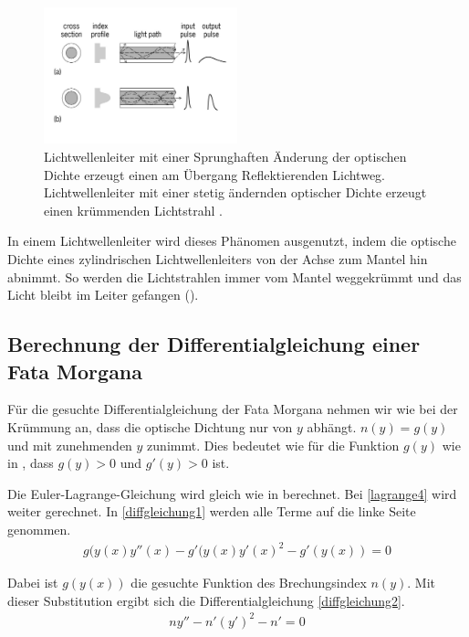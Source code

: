 \begin{figure}[H]
\begin{center}
\includegraphics[width=0.5\textwidth]{./picture/Lichtwellenleiter.pdf}
	\caption{Lichtwellenleiter mit einer Sprunghaften Änderung der optischen Dichte erzeugt einen am Übergang Reflektierenden Lichtweg. 
	Lichtwellenleiter mit einer stetig ändernden optischer Dichte erzeugt einen krümmenden Lichtstrahl \cite{opticFibre}. }
	\label{lichtleiter}
\end{center}	
\end{figure}

In einem Lichtwellenleiter wird dieses Phänomen ausgenutzt, 
indem  die  optische  Dichte  eines  zylindrischen
Lichtwellenleiters  von  der Achse zum Mantel hin abnimmt.
So werden die Lichtstrahlen immer vom Mantel weggekrümmt 
und das Licht  bleibt im Leiter gefangen ().


\subsection{Berechnung der Differentialgleichung einer Fata Morgana}

Für die gesuchte Differentialgleichung der Fata Morgana nehmen wir wie bei der Krümmung an, dass die optische Dichtung nur von $y$ abhängt. 
$n(y) = g(y)$ und mit zunehmenden $y$ zunimmt. Dies bedeutet wie für die Funktion $g(y)$ wie in , dass $g(y) > 0$ und $g'(y) > 0 $ ist.

Die Euler-Lagrange-Gleichung wird gleich wie in  berechnet. Bei \eqref{lagrange4} wird weiter gerechnet. In \eqref{diffgleichung1} werden alle Terme auf die linke Seite genommen.
\begin{align}
	g(y(x) y''(x)-g'(y(x) y'(x)^2 - g'(y(x)) =0 
	\label{diffgleichung1}
\end{align}

Dabei ist $g(y(x))$ die gesuchte Funktion des Brechungsindex $n(y)$. Mit dieser Substitution ergibt sich die Differentialgleichung \ref{diffgleichung2}.
\begin{align}
	n y''-n' (y')^2 - n' =0 
	\label{diffgleichung2}
\end{align}

